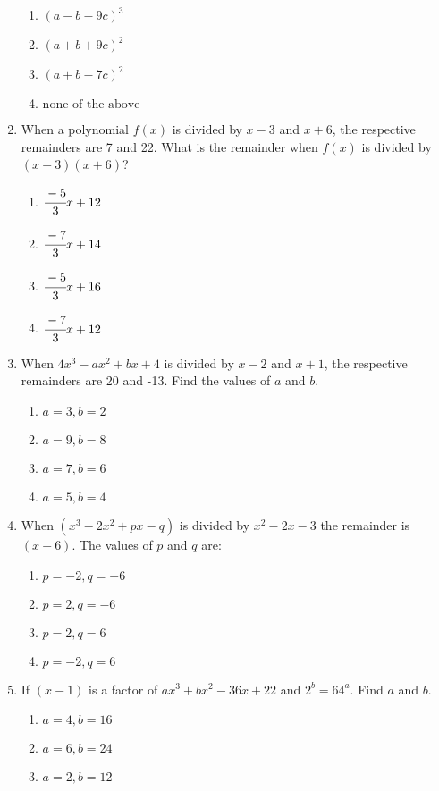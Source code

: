 \begin{multicols}{2}
\begin{enumerate}[label={\arabic*.}]
\begin{enumerate}[label={\Alph*.}]
        \item \((a-b-9c)^3\)
        \item \((a+b+9c)^2\)
        \item \((a+b-7c)^2\)
        \item \(\text{none of the above}\)
      \end{enumerate}
    \item When a polynomial $f(x)$ is divided by $x-3$ and $x+6$, the respective remainders are 7 and 22. What is the remainder when $f(x)$ is divided by $(x-3)(x+6)$?
      \begin{enumerate}[label={\Alph*.}]
        \item \(\cfrac{-5}{3}x + 12\)
        \item \(\cfrac{-7}{3}x + 14\)
        \item \(\cfrac{-5}{3}x + 16\)
        \item \(\cfrac{-7}{3}x + 12\)
      \end{enumerate}
    \item When $4x^3 - ax^2 + bx + 4$ is divided by $x-2$ and $x+1$, the respective remainders are 20 and -13. Find the values of $a$ and $b$.
      \begin{enumerate}[label={\Alph*.}]
        \item \(a= 3, b =2\)
        \item \(a=9, b=8\)
        \item \(a=7, b =6\)
        \item \(a=5,b=4\)
      \end{enumerate}
    \item When $(x^3 - 2x^2 + px -q)$ is divided by $x^2 - 2x -3$ the remainder is $(x-6)$. The values of $p$ and $q$ are:
      \begin{enumerate}[label={\Alph*.}]
        \item \(p = -2, q = -6\)
        \item \(p = 2, q = -6\)
        \item \(p = 2, q = 6\)
        \item \(p = -2, q = 6\)
      \end{enumerate}
    \item If $(x-1)$ is a factor of $ax^3 + bx^2 -36x + 22$ and $2^b = 64^a$. Find $a$ and $b$.
      \begin{enumerate}[label={\Alph*.}]
        \item \(a= 4, b =16\)
        \item \(a = 6, b =24\)
        \item \(a = 2, b =12\)

\end{enumerate}
\end{enumerate}
\end{multicols}

